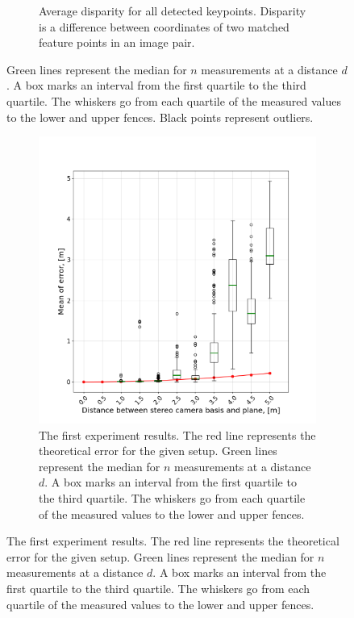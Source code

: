 \begin{figure}[ht]
\begin{subfigure}[t]{0.48\textwidth}
        \caption[Average disparity.]{Average disparity for all detected keypoints. 
        Disparity is a difference between coordinates of two matched feature points in an image pair.}
        \label{fig:exp_1_disparity}
    \end{subfigure}
  \label{fig:exp_1_res}
  \caption[The reprojection error.]{
        Green lines represent the median for $n$ measurements at a distance $d$. 
        A box marks an interval from the first quartile to the third quartile.
        The whiskers go from each quartile of the measured values to the lower and upper fences.
        Black points represent outliers.
  }
\end{figure}

\begin{figure}[ht]
  \begin{subfigure}[ht]{0.49\textwidth}
    \centering
    \includegraphics[width=\textwidth]{graphics/experiment_1_general.png}
    \caption[The first experiment results.]{The first experiment results. The red line represents the theoretical error for the given setup. 
        Green lines represent the median for $n$ measurements at a distance $d$. 
        A box marks an interval from the first quartile to the third quartile.
        The whiskers go from each quartile of the measured values to the lower and upper fences.
}
\end{subfigure}
\end{figure}
